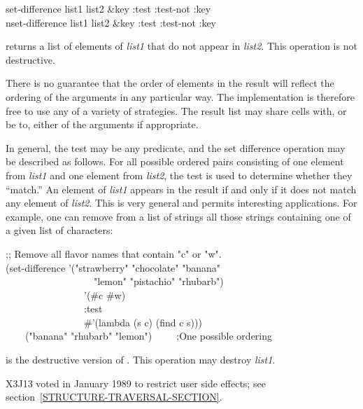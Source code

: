 \begin{defun}[Function]
set-difference list1 list2 &key :test :test-not :key \\
nset-difference list1 list2 &key :test :test-not :key

 returns a list of elements of \emph{list1}
that do not appear in \emph{list2}.  This operation is
not destructive.

There is no guarantee that the order of elements in the result will
reflect the ordering of the arguments in any particular way.
The implementation is therefore free to use any of a variety of strategies.
The result list may share cells with, or be  to, either of the arguments
if appropriate.

In general, the test may be any predicate, and the set difference operation
may be described as follows.  For all possible ordered pairs consisting of
one element from \emph{list1} and one element from \emph{list2}, the test is
used to determine whether they ``match.''  An element of \emph{list1}
appears in the result if and only if it does not match any element
of \emph{list2}. This is very general and permits interesting applications.
For example, one can remove from a list of strings all those strings
containing one of a given list of characters:
\begin{lisp}
;; Remove all flavor names that contain "c" or "w". \\
(set-difference '("strawberry" "chocolate" "banana" \\
~~~~~~~~~~~~~~~~~~"lemon" "pistachio" "rhubarb") \\
~~~~~~~~~~~~~~~~'(\#{\Xbackslash}c \#{\Xbackslash}w) \\
~~~~~~~~~~~~~~~~:test \\
~~~~~~~~~~~~~~~~\#'(lambda (s c) (find c s))) \\
~~~\EV\ ("banana" "rhubarb" "lemon")~~~~~;\textrm{One possible ordering}
\end{lisp}

 is the destructive version of .
This operation may destroy \emph{list1}.

\begin{new}
X3J13 voted in January 1989
to restrict user side effects; see section~\ref{STRUCTURE-TRAVERSAL-SECTION}.
\end{new}
\end{defun}

